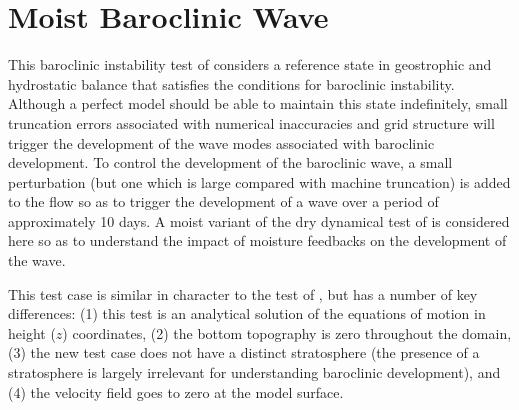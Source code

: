 \documentclass[times,doublespace]{fldauth}
\begin{document}

\clearpage
\section{Moist Baroclinic Wave} \label{sec:baroclinic_wave}
 
This baroclinic instability test of \cite{ullrich2014proposed} considers a reference state in geostrophic and hydrostatic balance that satisfies the conditions for baroclinic instability.  Although a perfect model should be able to maintain this state indefinitely, small truncation errors associated with numerical inaccuracies and grid structure will trigger the development of the wave modes associated with baroclinic development.  To control the development of the baroclinic wave, a small perturbation (but one which is large compared with machine truncation) is added to the flow so as to trigger the development of a wave over a period of approximately 10 days.  A moist variant of the dry dynamical test of \cite{ullrich2014proposed} is considered here so as to understand the impact of moisture feedbacks on the development of the wave.

This test case is similar in character to the test of \cite{jablonowski2006baroclinic}, but has a number of key differences:  (1) this test is an analytical solution of the equations of motion in height ($z$) coordinates, (2) the bottom topography is zero throughout the domain, (3) the new test case does not have a distinct stratosphere (the presence of a stratosphere is largely irrelevant for understanding baroclinic development), and (4) the velocity field goes to zero at the model surface.
 
\end{document}
